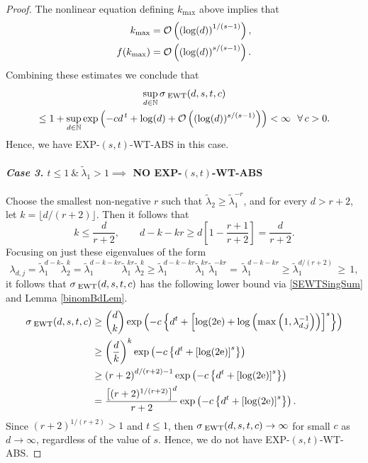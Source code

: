 \documentclass[graybox]{svmult}
\newcommand{\tlambda}{\widetilde{\lambda}}
\newcommand{\naturals}{\mathbb{N}}
\newcommand{\me}{\mathrm{e}}
\newcommand{\SEWT}{\sigma_{\;\textup{EWT}}}
\newcommand{\EXP}{\textup{EXP}\xspace}
\newcommand{\ABS}{\textup{ABS}\xspace}
\newcommand{\WT}{\textup{WT}\xspace}
\begin{document}
\begin{proof}
The nonlinear equation defining $k_{\max}$ above implies that
\begin{align*}
k_{\rm max} &=
\mathcal{O}\left(\left(\log(d)\right)^{1/(s-1)}\right),\\
f(k_{\rm max})&=
\mathcal{O}\left( \left(\log(d)\right)^{s/(s-1)}\right).
\end{align*}
Combining these estimates we conclude that
\begin{multline*}
\sup_{d\in \naturals}\SEWT(d,s,t,c )
\\
\le 1 + \sup_{d\in\naturals}
\exp\left(-cd^{\,t}+\log(d)+ \mathcal{O}\left((\log(d))^{s/(s-1)}\right)   \right)<\infty \
\ \forall\,c>0.
\end{multline*}
Hence, we have \EXP-$(s,t)$-\WT-\ABS in this case.

\paragraph{\textit{Case 3.} $t\le 1 \ \&  \ \tlambda_1 > 1 \implies$ NO \EXP-$(s,t)$-\WT-\ABS} \label{Case111f}

        Choose the smallest non-negative $r$ such that $\tlambda_2 \ge
        \tlambda_1^{-r}$, and for every $d > r+2$, let $k = \lfloor
        d/(r+2) \rfloor$.
        Then it follows that
        \begin{equation*}
        k \le \frac{d}{r+2}, \qquad d - k - kr \ge d\left[1 -\frac{r+1}{r+2} \right] = \frac{d}{r+2}.
        \end{equation*}
        Focusing on just these eigenvalues of the form
        \begin{equation*}
        \lambda_{d,j} = \tlambda_1^{d-k}  \tlambda_2^{k} =  \tlambda_1^{d-k-kr}  \tlambda_1^{kr}\tlambda_2^{k} \ge
        \tlambda_1^{d-k-kr}  \tlambda_1^{kr} \tlambda_1^{-kr} =\, \tlambda_1^{d-k-kr} \ge \tlambda_1^{d/(r+2)} \,\ge\, 1,
        \end{equation*}
        it follows that $\SEWT(d,s,t,c )$ has the following lower
        bound via \eqref{SEWTSingSum} and Lemma \ref{binomBdLem}.
        \begin{align*}
        \nonumber
        \SEWT(d,s,t,c )
        & \ge \binom{d}{k} \exp\left( -c \left \{d^t + \left [ \log(2\me) + \log \left(\max\left(1, \lambda_{d,j}^{-1} \right) \right) \right]^s \right \}\right) \\
        & \ge \left(\frac{d}{k}\right)^k \exp\left( -c \left \{d^t + \left [ \log(2\me) \right]^s \right \}\right) \\
        & \ge \left(r+2\right)^{d/(r+2) - 1} \exp\left( -c \left \{d^t + \left [ \log(2\me) \right]^s \right \}\right) \\
        & = \frac{\bigl[(r+2)^{1/(r+2)}\bigr]^d}{r+2} \exp\left( -c \left \{d^t + \left [ \log(2\me) \right]^s \right \}\right).
        \end{align*}
        Since $(r+2)^{1/(r+2)} > 1$ and $t \le 1$, then $\SEWT(d,s,t,c ) \to \infty$ for small $c$ as $d \to \infty$, regardless of the value of $s$.
        Hence, we do not have \EXP-$(s,t)$-\WT-\ABS.



\end{proof}
\end{document}
